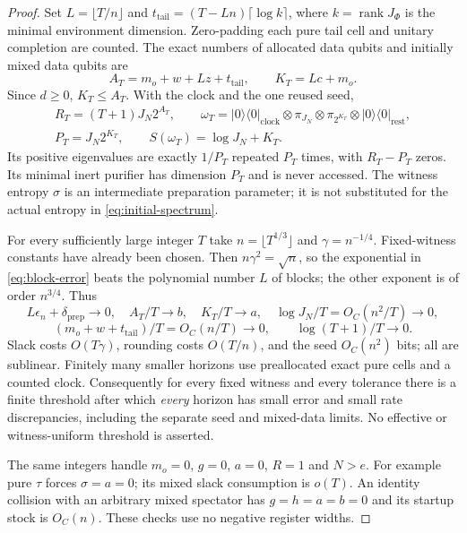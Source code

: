\documentclass[11pt,a4paper]{article}
\numberwithin{equation}{section}
\theoremstyle{plain}
\theoremstyle{definition}
\DeclareMathOperator{\rank}{rank}
\newcommand{\ketbra}[2]{\lvert #1 \rangle\langle #2 \rvert}
\begin{document}
\begin{proof}
Set $L=\lfloor T/n\rfloor$ and $t_{\mathrm{tail}}=(T-Ln)\lceil\log k\rceil$,
where $k=\rank J_\Phi$ is the minimal environment dimension. Zero-padding each
pure tail cell and unitary completion are counted. The exact numbers of
allocated data qubits and initially mixed data qubits are
\begin{equation}
\label{eq:data-widths}
A_T=m_o+w+Lz+t_{\mathrm{tail}},\qquad K_T=Lc+m_o .
\end{equation}
Since $d\ge 0$, $K_T\le A_T$. With the clock and the one reused seed,
\begin{equation}
\label{eq:initial-spectrum}
\begin{gathered}
R_T=(T+1)J_N2^{A_T},\qquad
\omega_T=\ketbra{0}{0}_{\mathrm{clock}}\otimes\pi_{J_N}\otimes
\pi_{2^{K_T}}\otimes\ketbra{0}{0}_{\mathrm{rest}},\\
P_T=J_N2^{K_T},\qquad S(\omega_T)=\log J_N+K_T .
\end{gathered}
\end{equation}
Its positive eigenvalues are exactly $1/P_T$ repeated $P_T$ times, with
$R_T-P_T$ zeros. Its minimal inert purifier has dimension $P_T$ and is never
accessed. The witness entropy $\sigma$ is an intermediate preparation
parameter; it is not substituted for the actual entropy in
\eqref{eq:initial-spectrum}.

For every sufficiently large integer $T$ take $n=\lfloor T^{1/3}\rfloor$ and
$\gamma=n^{-1/4}$. Fixed-witness constants have already been chosen. Then
$n\gamma^2=\sqrt{n}$, so the exponential in \eqref{eq:block-error} beats the
polynomial number $L$ of blocks; the other exponent is of order $n^{3/4}$.
Thus
\[
L\epsilon_n+\delta_{\mathrm{prep}}\to 0,\quad
A_T/T\to b,\quad K_T/T\to a,\quad
\log J_N/T=O_C(n^2/T)\to 0,
\]
\[
(m_o+w+t_{\mathrm{tail}})/T=O_C(n/T)\to 0,\qquad \log(T+1)/T\to 0 .
\]
Slack costs $O(T\gamma)$, rounding costs $O(T/n)$, and the seed $O_C(n^2)$
bits; all are sublinear. Finitely many smaller horizons use preallocated exact
pure cells and a counted clock. Consequently for every fixed witness and every
tolerance there is a finite threshold after which \emph{every} horizon has
small error and small rate discrepancies, including the separate seed and
mixed-data limits. No effective or witness-uniform threshold is asserted.

The same integers handle $m_o=0$, $g=0$, $a=0$, $R=1$ and $N>e$. For example
pure $\tau$ forces $\sigma=a=0$; its mixed slack consumption is $o(T)$. An
identity collision with an arbitrary mixed spectator has $g=h=a=b=0$ and its
startup stock is $O_C(n)$. These checks use no negative register widths.
\end{proof}
\end{document}

